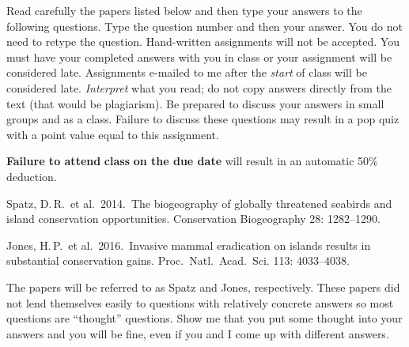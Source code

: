 \documentclass[11pt, addpoints]{exam}
\begin{document}
Read carefully the papers listed below and then type your answers to the following questions.
Type the question number and then your answer. You do not need to retype the question. Hand-written
assignments will not be accepted. You must have your completed answers
with you in class or your assignment will be considered late. Assignments e-mailed to me after the \emph{start} of class will be
considered late. \emph{Interpret} what you read; do not copy answers directly from the text (that would
be plagiarism). Be prepared to discuss your answers in small groups and as a class. Failure
to discuss these questions may result in a pop quiz with a point value
equal to this assignment.

\textbf{Failure to attend} \textbf{class} \textbf{on the due date} will
result in an automatic 50\% deduction.

\begin{hangparas}{1.5em}{1}
Spatz, D.\,R.~et al.~2014.~The biogeography of globally threatened seabirds and 
island conservation opportunities. Conservation Biogeography 28: 1282–1290.

Jones, H.\,P.~et al.~2016.~Invasive mammal eradication on islands results in 
substantial conservation gains. Proc.~Natl.~Acad.~Sci. 113: 4033–4038. 
\end{hangparas}

The papers will be referred to as Spatz and Jones, respectively. These papers did not lend themselves easily to questions with relatively concrete answers so most questions are “thought” questions. Show me that you put some thought into your answers and you will be fine, even if you and I come up with different answers.
\end{document}
